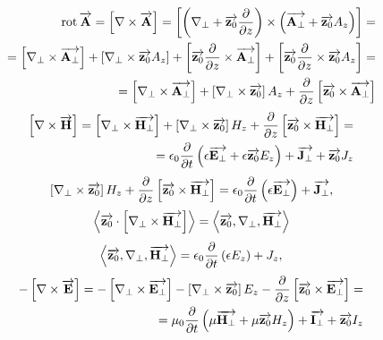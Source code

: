 \textcolor{blue}{ \begin{equation*} \begin{aligned}
\rot{\vect{A}} = \crossprod{\nabla}{\vect{A}} = \crossprod
{\left( \nabla_\perp + \vect{z_0} \partder{}{z} \right)}
{\left( \vect{A_\perp} + \vect{z_0} A_z \right)} = \\
= \crossprod{\nabla_\perp}{\vect{A_\perp}} + 
\crossprod{\nabla_\perp}{\vect{z_0} A_z} +
\crossprod{\vect{z_0} \partder{}{z}}{\vect{A_\perp}} +
\crossprod{ \vect{z_0} \partder{}{z} }{ \vect{z_0} A_z } = \\
= \crossprod{\nabla_\perp}{\vect{A_\perp}} + 
\crossprod{\nabla_\perp}{\vect{z_0}} A_z +
\partder{}{z} \crossprod{\vect{z_0}}{\vect{A_\perp}}
\end{aligned} \end{equation*} }
%
\textcolor{blue}{ \begin{equation*} \begin{aligned}
\crossprod{\nabla}{\vect{H}} = 
\crossprod{\nabla_\perp}{\vect{H_\perp}} + 
\crossprod{\nabla_\perp}{\vect{z_0}} H_z +
\partder{}{z} \crossprod{\vect{z_0}}{\vect{H_\perp}} = \\
= \epsilon_0 \partder{}{t} \left( \epsilon  \vect{E_\perp} + 
\epsilon \vect{z_0} E_z \right) + \vect{J_\perp} + \vect{z_0} J_z
\end{aligned} \end{equation*} }
%
\begin{equation} \label{eq:rotHt} 
\crossprod{\nabla_\perp}{\vect{z_0}} H_z +
\partder{}{z} \crossprod{\vect{z_0}}{\vect{H_\perp}} =
\epsilon_0 \partder{}{t} \left( \epsilon  \vect{E_\perp} \right) + 
\vect{J_\perp},
\end{equation}
%
\textcolor{blue}{ \begin{equation*} \begin{aligned}
\dotprod{\vect{z_0}}{\crossprod{\nabla_\perp}{\vect{H_\perp}}} =
\triple{\vect{z_0}}{\nabla_\perp}{\vect{H_\perp}}
\end{aligned} \end{equation*} }
%
\begin{equation} \label{eq:rotHz}
\triple{\vect{z_0}}{\nabla_\perp}{\vect{H_\perp}} = 
\epsilon_0 \partder{}{t} \left( \epsilon  E_z \right) + J_z,
\end{equation}
%
\textcolor{blue}{ \begin{equation*} \begin{aligned}
- \crossprod{\nabla}{\vect{E}} = 
- \crossprod{\nabla_\perp}{\vect{E_\perp}} - 
\crossprod{\nabla_\perp}{\vect{z_0}} E_z -
\partder{}{z} \crossprod{\vect{z_0}}{\vect{E_\perp}} = \\
= \mu_0 \partder{}{t} \left( \mu  \vect{H_\perp} + 
\mu \vect{z_0} H_z \right) + \vect{I_\perp} + \vect{z_0} I_z
\end{aligned} \end{equation*} }
